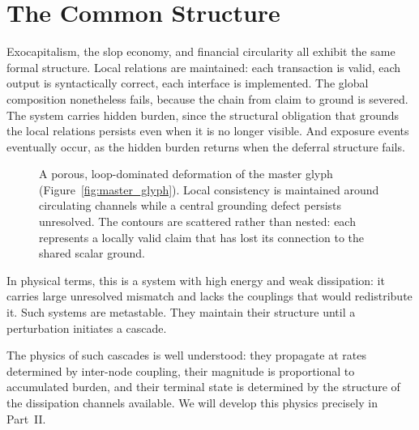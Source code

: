 \documentclass[12pt,a4paper,openany]{book}
\theoremstyle{plain}
\theoremstyle{definition}
\theoremstyle{remark}
\begin{document}
\section{The Common Structure}

Exocapitalism, the slop economy, and financial circularity all exhibit the same formal structure. Local relations are maintained: each transaction is valid, each output is syntactically correct, each interface is implemented. The global composition nonetheless fails, because the chain from claim to ground is severed. The system carries hidden burden, since the structural obligation that grounds the local relations persists even when it is no longer visible. And exposure events eventually occur, as the hidden burden returns when the deferral structure fails.

\begin{figure}[h]
\centering
{}
\caption[Porous loop glyph, Chapter~3: exocapitalism]{A porous, loop-dominated deformation of the master glyph (Figure~\ref{fig:master_glyph}). Local consistency is maintained around circulating channels while a central grounding defect persists unresolved. The contours are scattered rather than nested: each represents a locally valid claim that has lost its connection to the shared scalar ground.}
\label{fig:glyph_porous}
\end{figure}

In physical terms, this is a system with high energy and weak dissipation: it carries large unresolved mismatch and lacks the couplings that would redistribute it. Such systems are metastable. They maintain their structure until a perturbation initiates a cascade.

The physics of such cascades is well understood: they propagate at rates determined by inter-node coupling, their magnitude is proportional to accumulated burden, and their terminal state is determined by the structure of the dissipation channels available. We will develop this physics precisely in Part~II.
\end{document}
